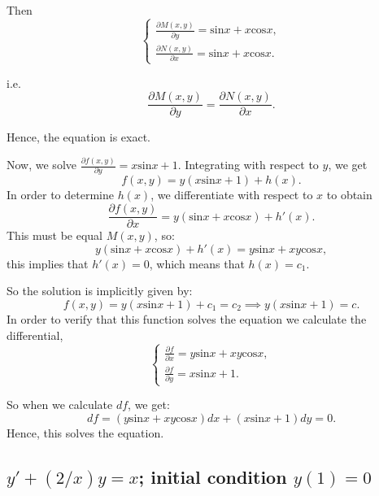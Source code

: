 \documentclass{article}
\begin{document}
		Then
		\begin{equation*}
			\begin{cases}
				\frac{\partial M(x,y)}{\partial y} = \text{sin}x + x\text{cos}x,
				\\
				\frac{\partial N(x,y)}{\partial x} = \text{sin}x + x\text{cos}x.
			\end{cases}
		\end{equation*}
		
		
	
		i.e. \[ \frac{\partial M(x,y)}{\partial y} = \frac{\partial N(x,y)}{\partial x}.\]

		Hence, the equation is exact.

		Now, we solve $\frac{\partial f(x,y)}{\partial y} = x\text{sin}x + 1$. 
		Integrating with respect to $y$, we get
		\[f(x,y) = y(x\text{sin}x +1) + h(x).\]
		In order to determine $h(x)$, we differentiate with
		respect to $x$ to obtain
		\[\frac{\partial f(x,y)}{\partial x} = y(\text{sin}x+x\text{cos}x) + h'(x).\]
		This must be equal $M(x,y)$, so:
		\[y(\text{sin}x+x\text{cos}x) + h'(x) = y\text{sin}x + xy\text{cos}x,\]
		this implies that $h'(x)=0$, which means that $h(x) = c_1$.
		
		So the solution is implicitly given by:
		\[ f(x,y) = y(x\text{sin}x +1) + c_1 = c_2 \implies y(x\text{sin}x +1) = c.\]
		In order to verify that this function solves the equation we calculate the differential,
		\begin{equation*}
			\begin{cases}
				\frac{\partial f}{\partial x} = y\text{sin}x + xy\text{cos}x,
				\\
				\frac{\partial f}{\partial y} = x\text{sin}x + 1.
			\end{cases}
		\end{equation*}

		
		So when we calculate $df$, we get:
		\[ df = (y\text{sin}x + xy\text{cos}x)dx + (x\text{sin}x + 1)dy =0.\]
		Hence, this solves the equation.
		
\subsection{$y' + (2/x)y = x$; initial condition $y(1)=0$}
\end{document}
